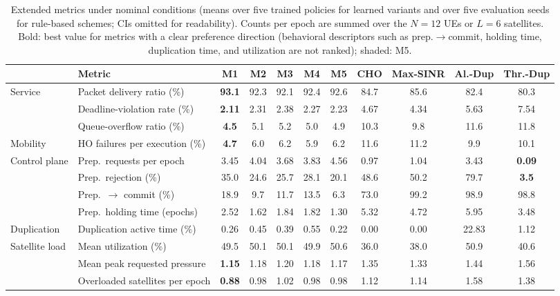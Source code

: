 \documentclass[journal]{IEEEtran}
\begin{document}
\begin{table}[t]
\centering
\caption{Extended metrics under nominal conditions (means over five trained policies for learned variants and over five evaluation seeds for rule-based schemes; CIs omitted for readability). Counts per epoch are summed over the $N=12$ UEs or $L=6$ satellites. Bold: best value for metrics with a clear preference direction (behavioral descriptors such as prep.$\to$commit, holding time, duplication time, and utilization are not ranked); shaded: M5.}
\label{tab:extended}
\footnotesize
\setlength{\tabcolsep}{3.5pt}
\begin{tabular}{@{}llccccccccc@{}}
\toprule
 & Metric & M1 & M2 & M3 & M4 & \cellcolor{gray!15}\textbf{M5} & CHO & Max-SINR & Al.-Dup & Thr.-Dup\\
\midrule
\multirow{3}{*}{Service} & Packet delivery ratio (\%) & \textbf{93.1} & 92.3 & 92.1 & 92.4 & \cellcolor{gray!15}92.6 & 84.7 & 85.6 & 82.4 & 80.3\\
 & Deadline-violation rate (\%) & \textbf{2.11} & 2.31 & 2.38 & 2.27 & \cellcolor{gray!15}2.23 & 4.67 & 4.34 & 5.63 & 7.54\\
 & Queue-overflow ratio (\%) & \textbf{4.5} & 5.1 & 5.2 & 5.0 & \cellcolor{gray!15}4.9 & 10.3 & 9.8 & 11.6 & 11.8\\
\midrule
Mobility & HO failures per execution (\%) & \textbf{4.7} & 6.0 & 6.2 & 5.9 & \cellcolor{gray!15}6.2 & 11.6 & 11.2 & 9.9 & 10.1\\
\midrule
\multirow{4}{*}{Control plane} & Prep.\ requests per epoch & 3.45 & 4.04 & 3.68 & 3.83 & \cellcolor{gray!15}4.56 & 0.97 & 1.04 & 3.43 & \textbf{0.09}\\
 & Prep.\ rejection (\%) & 35.0 & 24.6 & 25.7 & 28.1 & \cellcolor{gray!15}20.1 & 48.6 & 50.2 & 79.7 & \textbf{3.5}\\
 & Prep.\ $\to$ commit (\%) & 18.9 & 9.7 & 11.7 & 13.5 & \cellcolor{gray!15}6.3 & 73.0 & 99.2 & 98.9 & 98.8\\
 & Prep.\ holding time (epochs) & 2.52 & 1.62 & 1.84 & 1.82 & \cellcolor{gray!15}1.30 & 5.32 & 4.72 & 5.95 & 3.48\\
\midrule
Duplication & Duplication active time (\%) & 0.26 & 0.45 & 0.39 & 0.55 & \cellcolor{gray!15}0.22 & 0.00 & 0.00 & 22.83 & 1.12\\
\midrule
\multirow{3}{*}{Satellite load} & Mean utilization (\%) & 49.5 & 50.1 & 50.1 & 49.9 & \cellcolor{gray!15}50.6 & 36.0 & 38.0 & 50.9 & 40.6\\
 & Mean peak requested pressure & \textbf{1.15} & 1.18 & 1.20 & 1.18 & \cellcolor{gray!15}1.17 & 1.35 & 1.33 & 1.44 & 1.56\\
 & Overloaded satellites per epoch & \textbf{0.88} & 0.98 & 1.02 & 0.98 & \cellcolor{gray!15}0.98 & 1.12 & 1.14 & 1.58 & 1.38\\
\bottomrule
\end{tabular}
\end{table}
\end{document}
